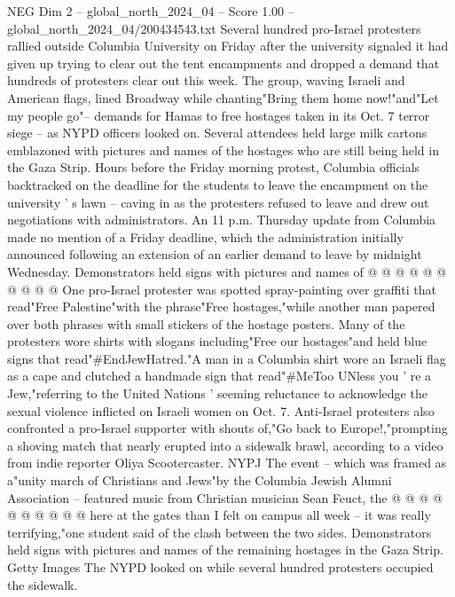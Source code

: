 \begin{textsample}{NEG Dim 2 – global\_north\_2024\_04 – Score 1.00 – global\_north\_2024\_04/200434543.txt}  \label{ex:f2_neg_277}
Several hundred pro-Israel protesters rallied outside Columbia University on Friday after the university signaled it had given up trying to clear out the tent encampments and dropped a demand that hundreds of protesters clear out this week.
The group, waving Israeli and American flags, lined Broadway while chanting"Bring them home now!"and"Let my people go"-- demands for Hamas to free hostages taken in its Oct. 7 terror siege -- as NYPD officers looked on.
Several attendees held large milk cartons emblazoned with pictures and names of the hostages who are still being held in the Gaza Strip.
Hours before the Friday morning protest, Columbia officials backtracked on the deadline for the students to leave the encampment on the university ' s lawn -- caving in as the protesters refused to leave and drew out negotiations with administrators.
An 11 p.m.
Thursday update from Columbia made no mention of a Friday deadline, which the administration initially announced following an extension of an earlier demand to leave by midnight Wednesday.
Demonstrators held signs with pictures and names of @ @ @ @ @ @ @ @ @ @ One pro-Israel protester was spotted spray-painting over graffiti that read"Free Palestine"with the phrase"Free hostages,"while another man papered over both phrases with small stickers of the hostage posters.
Many of the protesters wore shirts with slogans including"Free our hostages"and held blue signs that read"\#EndJewHatred."A man in a Columbia shirt wore an Israeli flag as a cape and clutched a handmade sign that read"\#MeToo UNless you ' re a Jew,"referring to the United Nations ' seeming reluctance to acknowledge the sexual violence inflicted on Israeli women on Oct. 7.
Anti-Israel protesters also confronted a pro-Israel supporter with shouts of,"Go back to Europe!,"prompting a shoving match that nearly erupted into a sidewalk brawl, according to a video from indie reporter Oliya Scootercaster.
NYPJ The event -- which was framed as a"unity march of Christians and Jews"by the Columbia Jewish Alumni Association -- featured music from Christian musician Sean Feuct, the @ @ @ @ @ @ @ @ @ @ here at the gates than I felt on campus all week -- it was really terrifying,"one student said of the clash between the two sides.
Demonstrators held signs with pictures and names of the remaining hostages in the Gaza Strip.
Getty Images The NYPD looked on while several hundred protesters occupied the sidewalk.

\end{textsample}
